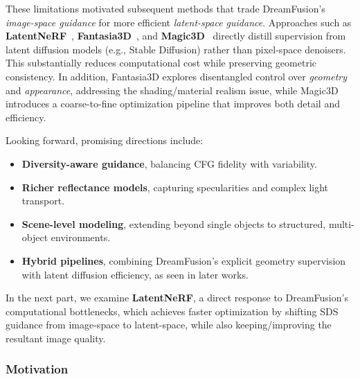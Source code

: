 \begin{enrichment}
\begin{enrichment}
        \noindent
        These limitations motivated subsequent methods that trade DreamFusion’s \emph{image-space guidance} for more efficient \emph{latent-space guidance}. Approaches such as \textbf{LatentNeRF}~\cite{metzer2022_latentnerf}, \textbf{Fantasia3D}~\cite{chen2023_fantasia3d}, and \textbf{Magic3D}~\cite{lin2023_magic3d} directly distill supervision from latent diffusion models (e.g., Stable Diffusion) rather than pixel-space denoisers. This substantially reduces computational cost while preserving geometric consistency. In addition, Fantasia3D explores disentangled control over \emph{geometry} and \emph{appearance}, addressing the shading/material realism issue, while Magic3D introduces a coarse-to-fine optimization pipeline that improves both detail and efficiency. 
        
        Looking forward, promising directions include:
        \begin{itemize}
            \item \textbf{Diversity-aware guidance}, balancing CFG fidelity with variability.
            \item \textbf{Richer reflectance models}, capturing specularities and complex light transport.
            \item \textbf{Scene-level modeling}, extending beyond single objects to structured, multi-object environments.
            \item \textbf{Hybrid pipelines}, combining DreamFusion’s explicit geometry supervision with latent diffusion efficiency, as seen in later works.
        \end{itemize}
        
        \noindent
        In the next part, we examine \textbf{LatentNeRF}, a direct response to DreamFusion’s computational bottlenecks, which achieves faster optimization by shifting SDS guidance from image-space to latent-space, while also keeping/improving the resultant image quality. 
        
    \end{enrichment}
    
    \newpage
    
    \begin{enrichment}
        \label{enr:chapter23_latentnerf}
        
        \subsubsection{Motivation}
        \label{subsec:chapter23_latentnerf_motivation}
        

\end{enrichment}
\end{enrichment}
